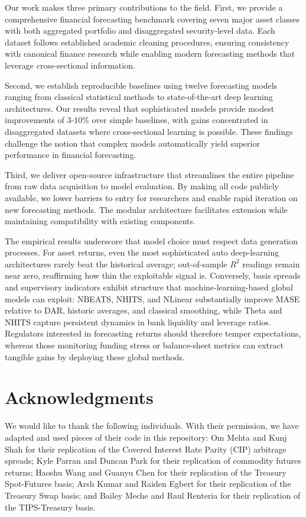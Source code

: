 \documentclass{article}
\begin{document}
Our work makes three primary contributions to the field. First, we provide a comprehensive financial forecasting benchmark covering seven major asset classes with both aggregated portfolio and disaggregated security-level data. Each dataset follows established academic cleaning procedures, ensuring consistency with canonical finance research while enabling modern forecasting methods that leverage cross-sectional information.

Second, we establish reproducible baselines using twelve forecasting models ranging from classical statistical methods to state-of-the-art deep learning architectures. Our results reveal that sophisticated models provide modest improvements of 3-10\% over simple baselines, with gains concentrated in disaggregated datasets where cross-sectional learning is possible. These findings challenge the notion that complex models automatically yield superior performance in financial forecasting.

Third, we deliver open-source infrastructure that streamlines the entire pipeline from raw data acquisition to model evaluation. By making all code publicly available, we lower barriers to entry for researchers and enable rapid iteration on new forecasting methods. The modular architecture facilitates extension while maintaining compatibility with existing components.

The empirical results underscore that model choice must respect data generation processes. For asset returns, even the most sophisticated auto deep-learning architectures rarely beat the historical average; out-of-sample $R^2$ readings remain near zero, reaffirming how thin the exploitable signal is. Conversely, basis spreads and supervisory indicators exhibit structure that machine-learning-based global models can exploit: NBEATS, NHITS, and NLinear substantially improve MASE relative to DAR, historic averages, and classical smoothing, while Theta and NHITS capture persistent dynamics in bank liquidity and leverage ratios. Regulators interested in forecasting returns should therefore temper expectations, whereas those monitoring funding stress or balance-sheet metrics can extract tangible gains by deploying these global methods.


\section*{Acknowledgments}

We would like to thank the following individuals. With their permission, we have adapted and used pieces of their code in this repository: Om Mehta and Kunj Shah for their replication of the Covered Interest Rate Parity (CIP) arbitrage spreads; Kyle Parran and Duncan Park for their replication of commodity futures returns; Haoshu Wang and Guanyu Chen for their replication of the Treasury Spot-Futures basis; Arsh Kumar and Raiden Egbert for their replication of the Treasury Swap basis; and Bailey Meche and Raul Renteria for their replication of the TIPS-Treasury basis.
\end{document}
